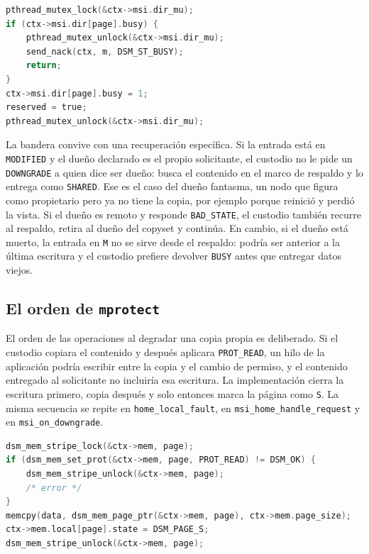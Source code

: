 \documentclass[11pt,spanish]{article}
\begin{document}
\begin{lstlisting}[language=C, caption={Reserva de la página en el custodio.}, label={lst:busy}]
pthread_mutex_lock(&ctx->msi.dir_mu);
if (ctx->msi.dir[page].busy) {
    pthread_mutex_unlock(&ctx->msi.dir_mu);
    send_nack(ctx, m, DSM_ST_BUSY);
    return;
}
ctx->msi.dir[page].busy = 1;
reserved = true;
pthread_mutex_unlock(&ctx->msi.dir_mu);
\end{lstlisting}

La bandera convive con una recuperación específica. Si la entrada está en \texttt{MODIFIED} y el dueño declarado es el propio solicitante, el custodio no le pide un \texttt{DOWNGRADE} a quien dice ser dueño: busca el contenido en el marco de respaldo y lo entrega como \texttt{SHARED}. Ese es el caso del dueño fantasma, un nodo que figura como propietario pero ya no tiene la copia, por ejemplo porque reinició y perdió la vista. Si el dueño es remoto y responde \texttt{BAD\_STATE}, el custodio también recurre al respaldo, retira al dueño del copyset y continúa. En cambio, si el dueño está muerto, la entrada en \texttt{M} no se sirve desde el respaldo: podría ser anterior a la última escritura y el custodio prefiere devolver \texttt{BUSY} antes que entregar datos viejos.

\subsection{El orden de \texttt{mprotect}}

El orden de las operaciones al degradar una copia propia es deliberado. Si el custodio copiara el contenido y después aplicara \texttt{PROT\_READ}, un hilo de la aplicación podría escribir entre la copia y el cambio de permiso, y el contenido entregado al solicitante no incluiría esa escritura. La implementación cierra la escritura primero, copia después y solo entonces marca la página como \texttt{S}. La misma secuencia se repite en \texttt{home\_local\_fault}, en \texttt{msi\_home\_handle\_request} y en \texttt{msi\_on\_downgrade}.

\begin{lstlisting}[language=C, caption={Degradación antes de copiar el contenido que se entrega.}, label={lst:mprotect}]
dsm_mem_stripe_lock(&ctx->mem, page);
if (dsm_mem_set_prot(&ctx->mem, page, PROT_READ) != DSM_OK) {
    dsm_mem_stripe_unlock(&ctx->mem, page);
    /* error */
}
memcpy(data, dsm_mem_page_ptr(&ctx->mem, page), ctx->mem.page_size);
ctx->mem.local[page].state = DSM_PAGE_S;
dsm_mem_stripe_unlock(&ctx->mem, page);
\end{lstlisting}
\end{document}
